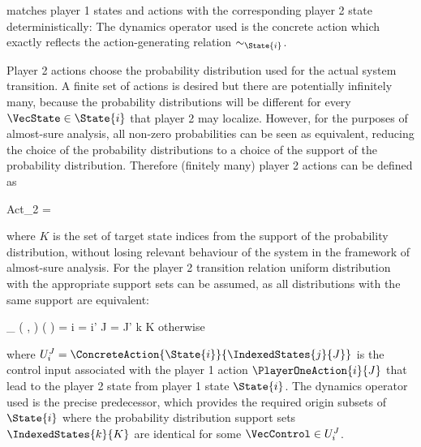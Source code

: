     matches player 1 states and actions with the corresponding player 2 state deterministically:
    The dynamics operator used is the concrete action which exactly reflects the action-generating relation $\sim_{\State {i}}$.

    Player 2 actions choose the probability distribution used for the actual system transition.
    A finite set of actions is desired but there are potentially infinitely many, because the probability distributions will be different for every $\VecState \in \State{i}$ that player 2 may localize.
    However, for the purposes of almost-sure analysis, all non-zero probabilities can be seen as equivalent, reducing the choice of the probability distributions to a choice of the support of the probability distribution. %
    Therefore (finitely many) player 2 actions can be defined as

    \startformula
        Act_2 =  \EndComma
    \stopformula

    where $K$ is the set of target state indices from the support of the probability distribution, without losing relevant behaviour of the system in the framework of almost-sure analysis.
    For the player 2 transition relation uniform distribution with the appropriate support sets can be assumed, as all distributions with the same support are equivalent:

    \startformula
        \Transition_\GameGraph
            \Big( ,  \Big)
            \Big(  \Big)
        = \startmathcases
            \NC \displaystyle{}
            \MC \startgathered
                    \NC \StartIf i = i' \MidAnd J = J' \MidAnd k \in K
                    \NR
                    \NC \quad \MidAnd {} \neq \emptyset
                    \NR
                \stopgathered
            \NR
            \NC otherwise \EndComma
            \NR
        \stopmathcases
    \stopformula

    where $U_i^J = \ConcreteAction{\State{i}}{\IndexedStates{j}{J}}$ is the control input associated with the player 1 action $\PlayerOneAction{i}{J}$ that lead to the player 2 state from player 1 state $\State{i}$.
    The dynamics operator used is the precise predecessor, which provides the required origin subsets of $\State{i}$ where the probability distribution support sets $\IndexedStates{k}{K}$ are identical for some $\VecControl \in U_i^J$.

